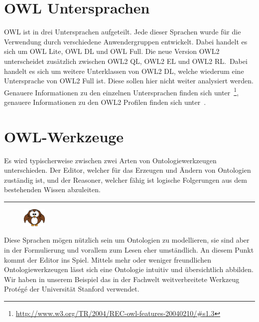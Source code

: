 \section{OWL Untersprachen}
\label{sec:owl_owl_Untersprachen}
OWL ist in drei Untersprachen aufgeteilt. Jede dieser Sprachen wurde für die Verwendung durch verschiedene Anwendergruppen entwickelt. Dabei handelt es sich um OWL Lite, OWL DL und OWL Full. Die neue Version OWL2 unterscheidet zusätzlich zwischen OWL2 QL, OWL2 EL und OWL2 RL.\ Dabei handelt es sich um weitere Unterklassen von OWL2 DL, welche wiederum eine Untersprache von OWL2 Full ist. Diese sollen hier nicht weiter analysiert werden. Genauere Informationen zu den einzelnen Untersprachen finden sich unter~\footnote{\url{http://www.w3.org/TR/2004/REC-owl-features-20040210/#s1.3}}, genauere Informationen zu den OWL2 Profilen finden sich unter~.

\section{OWL-Werkzeuge}
\label{sec:owl_owl_OwlTools}
Es wird typischerweise zwischen zwei Arten von Ontologiewerkzeugen unterschieden. Der Editor, welcher für das Erzeugen und Ändern von Ontologien zuständig ist, und der Reasoner, welcher fähig ist logische Folgerungen aus dem bestehenden Wissen abzuleiten.

\noindent\rule[1ex]{\textwidth}{1pt}
\begin{figure}
    \vspace{-19pt}
    \includegraphics[width=0.1\textwidth]{bilder/owl.png}
\end{figure}
Diese Sprachen mögen nützlich sein um Ontologien zu modellieren, sie sind aber in der Formulierung und vorallem zum Lesen eher umständlich. An diesem Punkt kommt der Editor ins Spiel. Mittels mehr oder weniger freundlichen Ontologiewerkzeugen lässt sich eine Ontologie intuitiv und übersichtlich abbilden. Wir haben in unserem Beispiel das in der Fachwelt weitverbreitete Werkzeug Protégé der Universität Stanford verwendet.

